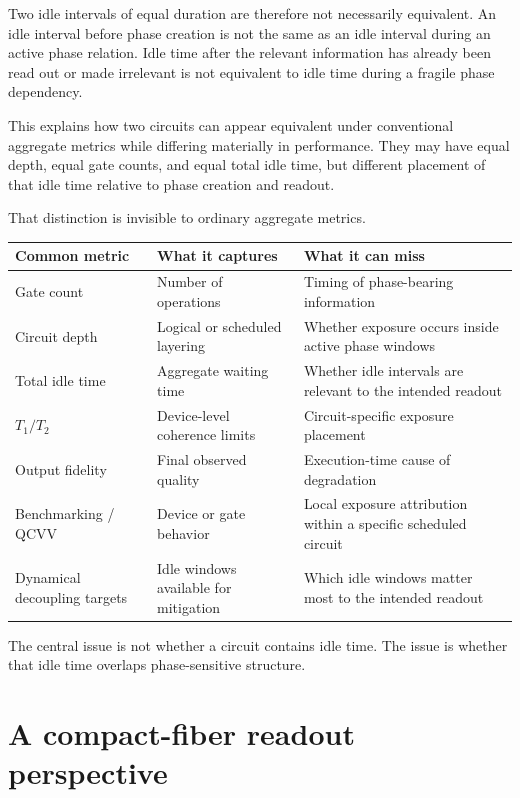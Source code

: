 \documentclass[11pt]{article}
\begin{document}
Two idle intervals of equal duration are therefore not necessarily equivalent. An idle interval before phase creation is not the same as an idle interval during an active phase relation. Idle time after the relevant information has already been read out or made irrelevant is not equivalent to idle time during a fragile phase dependency.

This explains how two circuits can appear equivalent under conventional aggregate metrics while differing materially in performance. They may have equal depth, equal gate counts, and equal total idle time, but different placement of that idle time relative to phase creation and readout.

That distinction is invisible to ordinary aggregate metrics.

\begin{center}
\renewcommand{\arraystretch}{1.25}
\begin{tabularx}{\textwidth}{>{\raggedright\arraybackslash}p{}
>{\raggedright\arraybackslash}p{}
>{\raggedright\arraybackslash}X}
\toprule
Common metric & What it captures & What it can miss \\
\midrule
Gate count & Number of operations & Timing of phase-bearing information \\
Circuit depth & Logical or scheduled layering & Whether exposure occurs inside active phase windows \\
Total idle time & Aggregate waiting time & Whether idle intervals are relevant to the intended readout \\
\(T_1/T_2\) & Device-level coherence limits & Circuit-specific exposure placement \\
Output fidelity & Final observed quality & Execution-time cause of degradation \\
Benchmarking / QCVV & Device or gate behavior & Local exposure attribution within a specific scheduled circuit \\
Dynamical decoupling targets & Idle windows available for mitigation & Which idle windows matter most to the intended readout \\
\bottomrule
\end{tabularx}
\end{center}

The central issue is not whether a circuit contains idle time. The issue is whether that idle time overlaps phase-sensitive structure.

\section*{A compact-fiber readout perspective}
\end{document}
